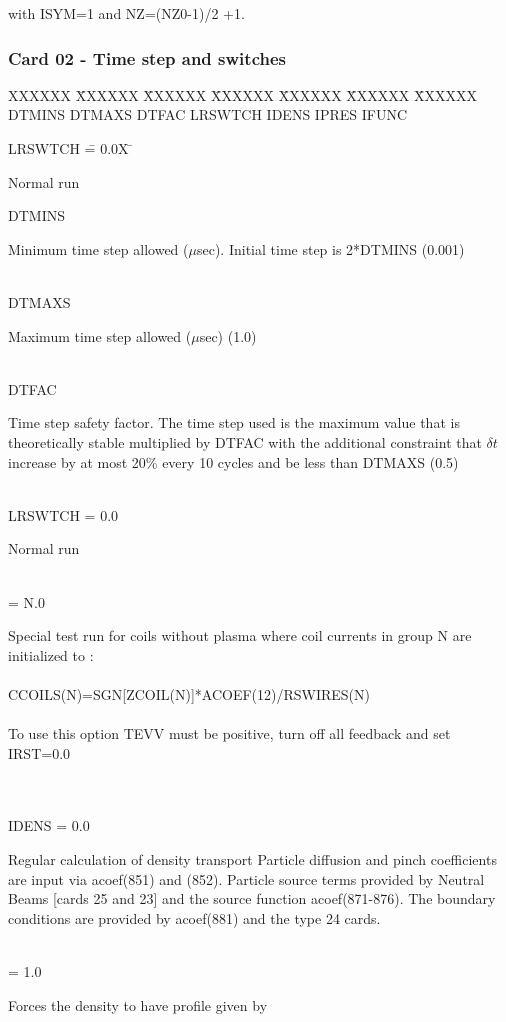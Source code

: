 with
ISYM=1 and NZ=(NZ0-1)/2 +1.
\newpage \subsubsection{Card 02 - Time step and switches} 
\begin{tabbing} 
XXXXXX \= XXXXXX \= XXXXXX \= XXXXXX \= XXXXXX \= XXXXXX \=
XXXXXX        \\ 
\footnotesize DTMINS \>\footnotesize DTMAXS \>\footnotesize DTFAC \>\footnotesize
LRSWTCH \>\footnotesize IDENS \>\footnotesize IPRES \>\footnotesize IFUNC 
\end{tabbing}
\begin{tabbing} 
LRSWTCH \= = 0.0X \= \parbox[t]{\width}{ Normal run } \kill 
DTMINS \>       \> \parbox[t]{\width}{Minimum time step allowed ($\mu$sec).  Initial time step
is 2*DTMINS (0.001)} \\ 
DTMAXS \>       \> \parbox[t]{\width}{ Maximum time step allowed ($\mu$sec) (1.0)} \\ 
DTFAC  \>       \> \parbox[t]{\width}{ Time step safety factor. The time step used is the
maximum value that is theoretically stable multiplied by DTFAC with the
additional constraint that $\delta t$ increase by at most 20\% every 10 cycles and be less than
DTMAXS (0.5)} \\ 
LRSWTCH \> = 0.0 \> \parbox[t]{\width}{ Normal run} \\ 
                 \> = N.0 \> \parbox[t]{\width}{ Special test run for coils without plasma where coil
currents in group N are initialized to :\\
 \\
CCOILS(N)=SGN[ZCOIL(N)]*ACOEF(12)/RSWIRES(N) \\
 \\
To use this option TEVV must be positive, turn off all feedback and set IRST=0.0} \\ 
 \\
IDENS \>  = 0.0 \> \parbox[t]{\width}{ Regular calculation of density transport 
Particle diffusion and pinch coefficients are input via acoef(851) and (852).
Particle source terms provided by Neutral Beams [cards 25 and 23] and the
source function acoef(871-876). The boundary
conditions are provided by acoef(881) and the type 24 cards.
} \\ 
        \> = 1.0 \> \parbox[t]{\width}{ Forces the density to have profile given by} 
\end{tabbing} 
